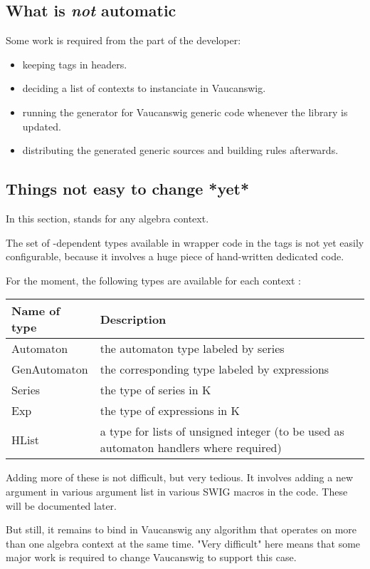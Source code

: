 \subsection{What is \emph{not} automatic}

Some work is required from the part of the developer:
\begin{itemize}
\item keeping  tags in \Vauc headers.

\item deciding a list of contexts to instanciate in Vaucanswig.

\item running the generator for Vaucanswig generic code whenever
  the \Vauc library is updated.

\item distributing the generated generic sources and building rules
  afterwards.
\end{itemize}

\subsection{Things not easy to change *yet*}

In this section,  stands for any algebra context.

The set of  -dependent types available in wrapper code in the
 tags is not yet easily configurable, because it
involves a huge piece of hand-written dedicated code.

For the moment, the following types are available for each
context :

\begin{tabular}{|l|p{.6\linewidth}|}
  \hline
   Name of type   & Description\\
  \hline
     Automaton	& the automaton type labeled by series \\
     GenAutomaton& the corresponding type labeled by expressions \\
     Series	& the type of series in K \\
     Exp	& the type of expressions in K \\
     HList	& a type for lists of unsigned integer
                  (to be used as automaton handlers where required)\\
  \hline
\end{tabular}

Adding more of these is not difficult, but very tedious. It involves
adding a new argument in various argument list in various SWIG macros
in the code. These will be documented later.

But still, it remains  to bind in Vaucanswig
any algorithm that operates on more than one algebra context at the
same time. "Very difficult" here means that some major work is
required to change Vaucanswig to support this case.



